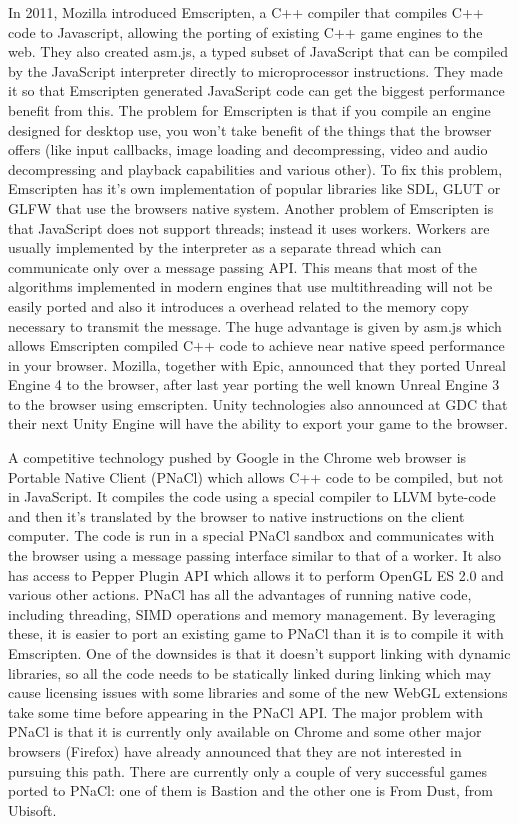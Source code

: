 In 2011, Mozilla introduced Emscripten, a C++ compiler that compiles C++ code to
Javascript, allowing the porting of existing C++ game engines to the web. They also
created asm.js, a typed subset of JavaScript that can be compiled by the JavaScript
interpreter directly to microprocessor instructions. They made it so that Emscripten
generated JavaScript code can get the biggest performance benefit from this. The problem for Emscripten is that if you compile an engine designed for desktop use, you won’t take benefit of the things that the browser offers (like input callbacks, image loading and decompressing, video and audio decompressing and playback capabilities and various other). To fix this problem, Emscripten has it’s own implementation of popular libraries like SDL, GLUT or GLFW that use the browsers native system. Another problem of Emscripten is that JavaScript does not support threads; instead it uses workers. Workers are usually implemented by the interpreter as a separate thread which can communicate only over a message passing API. This means that most of the algorithms implemented in modern engines that use multithreading will not be easily ported and also it introduces a overhead related to the memory copy necessary to transmit the message. The huge advantage is given by asm.js which allows Emscripten compiled C++ code to achieve near native speed performance in your browser. Mozilla, together with Epic, announced that they ported Unreal Engine 4 to the browser, after last year porting the well known Unreal Engine 3 to the browser using emscripten. Unity technologies also announced at GDC that their next Unity Engine will have the ability to export your game to the browser.


A competitive technology pushed by Google in the Chrome web browser is Portable Native
Client (PNaCl) which allows C++ code to be compiled, but not in JavaScript. It compiles
the code using a special compiler to LLVM byte-code and then it’s translated by the
browser to native instructions on the client computer. The code is run in a special PNaCl sandbox and communicates with the browser using a message passing interface similar to that of a worker. It also has access to Pepper Plugin API which allows it to perform OpenGL ES 2.0 and various other actions. PNaCl has all the advantages of running native code, including threading, SIMD operations and memory management. By leveraging these, it is easier to port an existing game to PNaCl than it is to compile it with Emscripten.
One of the downsides is that it doesn’t support linking with dynamic libraries, so all the code needs to be statically linked during linking which may cause licensing issues with some libraries and some of the new WebGL extensions take some time before appearing in the PNaCl API. The major problem with PNaCl is that it is currently only available on Chrome and some other major browsers (Firefox) have already announced that they are not interested in pursuing this path. There are currently only a couple of very successful games ported to PNaCl: one of them is Bastion and the other one is From Dust, from Ubisoft.


